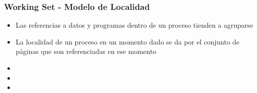 \begin{frame}
  \frametitle{Working Set - \textbf{Modelo de Localidad}}
  \begin{itemize}
  	\item Las referencias a datos y programas dentro de un proceso tienden a agruparse
  	\item La localidad de un proceso en un momento dado se da por el conjunto de páginas que son referenciadas en ese momento
  	\item
  	\item 
  	\item
  \end{itemize}
\end{frame}


